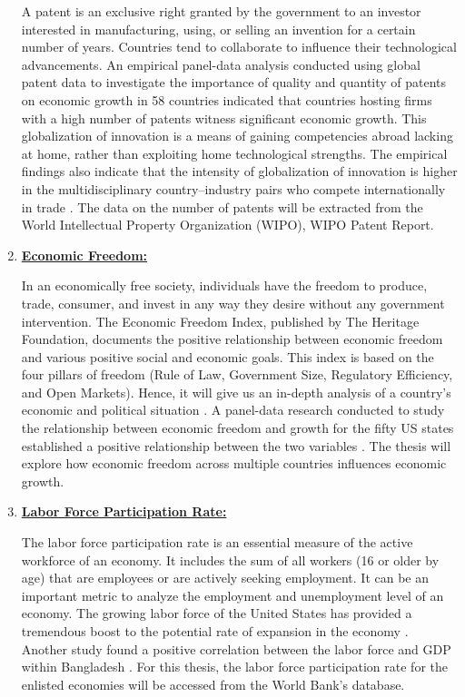 \begin{enumerate}
A patent is an exclusive right granted by the government to an investor interested in manufacturing, using, or selling an invention for a certain number of years. Countries tend to collaborate to influence their technological advancements. An empirical panel-data analysis conducted using global patent data to investigate the importance of quality and quantity of patents on economic growth in 58 countries indicated that countries hosting firms with a high number of patents witness significant economic growth. This globalization of innovation is a means of gaining competencies abroad lacking at home, rather than exploiting home technological strengths. The empirical findings also indicate that the intensity of globalization of innovation is higher in the multidisciplinary country–industry pairs who compete internationally in trade \cite{causa_serres_ruiz_2014}. The data on the number of patents will be extracted from the World Intellectual Property Organization (WIPO), WIPO Patent Report.

\item \underline{\textbf{Economic Freedom:}}

In an economically free society, individuals have the freedom to produce, trade, consumer, and invest in any way they desire without any government intervention. The Economic Freedom Index, published by The Heritage Foundation, documents the positive relationship between economic freedom and various positive social and economic goals. This index is based on the four pillars of freedom (Rule of Law, Government Size, Regulatory Efficiency, and Open Markets). Hence, it will give us an in-depth analysis of a country's economic and political situation \cite{miller20102010}. A panel-data research conducted to study the relationship between economic freedom and growth for the fifty US states established a positive relationship between the two variables \cite{chintrakarn2012fdi}. The thesis will explore how economic freedom across multiple countries influences economic growth.

\item \underline{\textbf{Labor Force Participation Rate:}}

The labor force participation rate is an essential measure of the active workforce of an economy. It includes the sum of all workers (16 or older by age)  that are employees or are actively seeking employment. It can be an important metric to analyze the employment and unemployment level of an economy. The growing labor force of the United States has provided a tremendous boost to the potential rate of expansion in the economy \cite{regev_2007}. Another study found a positive correlation between the labor force and GDP within Bangladesh \cite{hossain2012total}. For this thesis, the labor force participation rate for the enlisted economies will be accessed from the World Bank’s database.

\end{enumerate}

